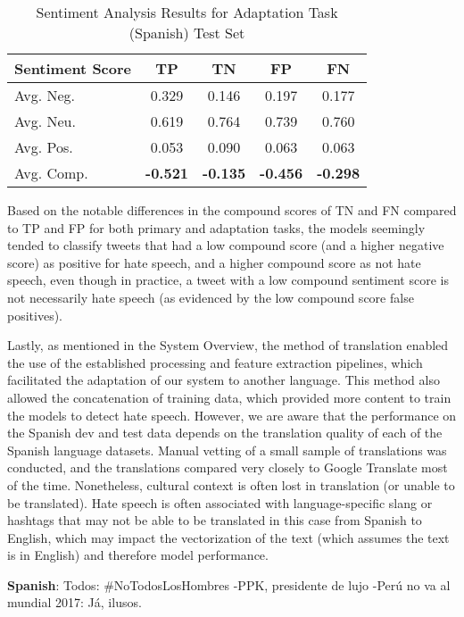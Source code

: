 \documentclass[11pt,a4paper]{article}
\begin{document}
\begin{table}[h]
\centering
\caption{Sentiment Analysis Results for Adaptation Task (Spanish) Test Set}
\label{tab:errors}
\small
\begin{tabular}{lcccc}
\hline
Sentiment Score & TP & TN & FP & FN \\
\hline
Avg. Neg. & 0.329 & 0.146 & 0.197 & 0.177 \\
Avg. Neu. & 0.619 & 0.764 & 0.739 & 0.760 \\
Avg. Pos. & 0.053 & 0.090 & 0.063 & 0.063 \\
Avg. Comp. & \textbf{-0.521} & \textbf{-0.135} & \textbf{-0.456} & \textbf{-0.298} \\
 
\hline
\end{tabular}
\end{table}

Based on the notable differences in the compound scores of TN and FN compared to TP and FP for both primary and adaptation tasks, the models seemingly tended to classify tweets that had a low compound score (and a higher negative score) as positive for hate speech, and a higher compound score as not hate speech, even though in practice, a tweet with a low compound sentiment score is not necessarily hate speech (as evidenced by the low compound score false positives).

Lastly, as mentioned in the System Overview, the method of translation enabled the use of the established processing and feature extraction pipelines, which facilitated the adaptation of our system to another language. This method also allowed the concatenation of training data, which provided more content to train the models to detect hate speech. However, we are aware that the performance on the Spanish dev and test data depends on the translation quality of each of the Spanish language datasets. Manual vetting of a small sample of translations was conducted, and the translations compared very closely to Google Translate most of the time. Nonetheless, cultural context is often lost in translation (or unable to be translated). Hate speech is often associated with language-specific slang or hashtags that may not be able to be translated in this case from Spanish to English, which may impact the vectorization of the text (which assumes the text is in English) and therefore model performance.

\begin{displayquote}
    \textbf{Spanish}: Todos: \#NoTodosLosHombres -PPK, presidente de lujo -Perú no va al mundial 2017: Já, ilusos.
\end{displayquote}
\end{document}
